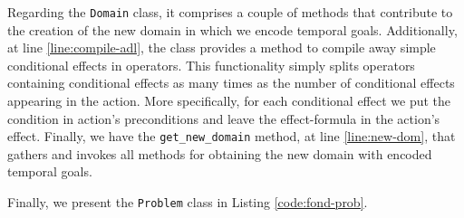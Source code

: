 Regarding the \texttt{Domain} class, it comprises a couple of methods that contribute to the creation of the new domain in which we encode temporal goals. Additionally, at line \ref{line:compile-adl}, the class provides a method to compile away simple conditional effects in operators. This functionality simply splits operators containing conditional effects as many times as the number of conditional effects appearing in the action. More specifically, for each conditional effect we put the condition in action's preconditions and leave the effect-formula in the action's effect. Finally, we have the \texttt{get\_new\_domain} method, at line \ref{line:new-dom}, that gathers and invokes all methods for obtaining the new domain with encoded temporal goals.

Finally, we present the \texttt{Problem} class in Listing \ref{code:fond-prob}.

